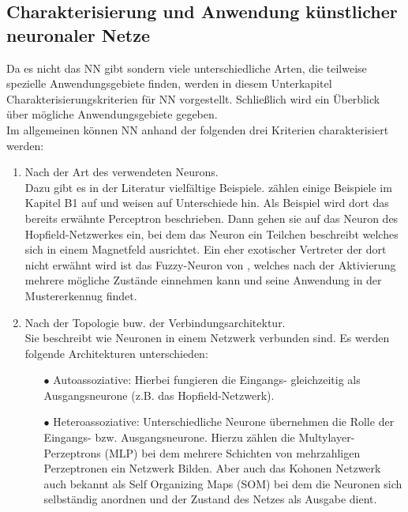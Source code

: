 \subsection{Charakterisierung und Anwendung künstlicher neuronaler Netze}

Da es nicht das NN gibt sondern viele unterschiedliche Arten, die teilweise spezielle Anwendungsgebiete finden, werden in diesem Unterkapitel Charakterisierungskriterien für NN vorgestellt. Schließlich wird ein Überblick über mögliche Anwendungsgebiete gegeben.\\

Im allgemeinen können NN anhand der folgenden drei Kriterien charakterisiert werden:%

\begin{enumerate}
\item%
Nach der Art des verwendeten Neurons.\\
Dazu gibt es in der Literatur vielfältige Beispiele. \citet{Fiesler96} zählen einige Beispiele im Kapitel B1 auf und weisen auf Unterschiede hin. Als Beispiel wird dort das bereits erwähnte Perceptron beschrieben. Dann gehen sie auf das Neuron des Hopfield-Netzwerkes ein, bei dem das Neuron ein Teilchen beschreibt welches sich in einem Magnetfeld ausrichtet. Ein eher exotischer Vertreter der dort nicht erwähnt wird ist das Fuzzy-Neuron von \citet{fuzzy-neuron}, welches nach der Aktivierung mehrere mögliche Zustände einnehmen kann und seine Anwendung in der Mustererkennug findet.

\item%
Nach der Topologie buw. der Verbindungsarchitektur.\\
Sie beschreibt wie Neuronen in einem Netzwerk verbunden sind.
Es werden folgende Architekturen unterschieden:
\begin{itemize}
\item[\textbf{$\bullet$}]%
Autoassoziative: Hierbei fungieren die Eingangs- gleichzeitig als Ausgangsneurone (z.B. das Hopfield-Netzwerk). 

\item[\textbf{$\bullet$}]%
Heteroassoziative: Unterschiedliche Neurone übernehmen die Rolle der Eingangs- bzw. Ausgangsneurone. Hierzu zählen die Multylayer-Perzeptrons (MLP) bei dem mehrere Schichten von mehrzahligen Perzeptronen ein Netzwerk Bilden. Aber auch das Kohonen Netzwerk auch bekannt als Self Organizing Maps (SOM) bei dem die Neuronen sich selbständig anordnen und der Zustand des Netzes als Ausgabe dient.


\end{itemize}
\end{enumerate}
